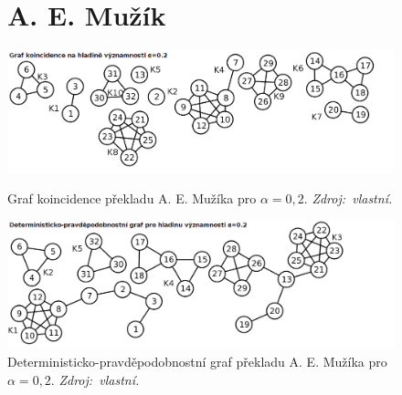 \documentclass[dp.tex]{subfiles}
\begin{document}
\begin{figure}[h]
\section*{A. E. Mužík}
	\centering
	\includegraphics[max width=\textwidth,keepaspectratio=true]{imgs-99-priloha-d/r_k_20}
	\caption[Graf koincidence překladu A. E. Mužíka pro $\alpha = 0{,}2$]
            {Graf koincidence překladu A. E. Mužíka pro $\alpha = 0{,}2$. \textit{Zdroj:~vlastní.}}
	\label{fig:r_k_20}
	\includegraphics[max width=\textwidth,keepaspectratio=true]{imgs-99-priloha-d/r_d_20}
	\caption[Deterministicko-pravděpodobnostní graf překladu A. E. Mužíka pro $\alpha = 0{,}2$]
            {Deterministicko-pravděpodobnostní graf překladu A. E. Mužíka pro $\alpha = 0{,}2$. \textit{Zdroj:~vlastní.}}
	\label{fig:r_d_20}
\end{figure}
\end{document}
